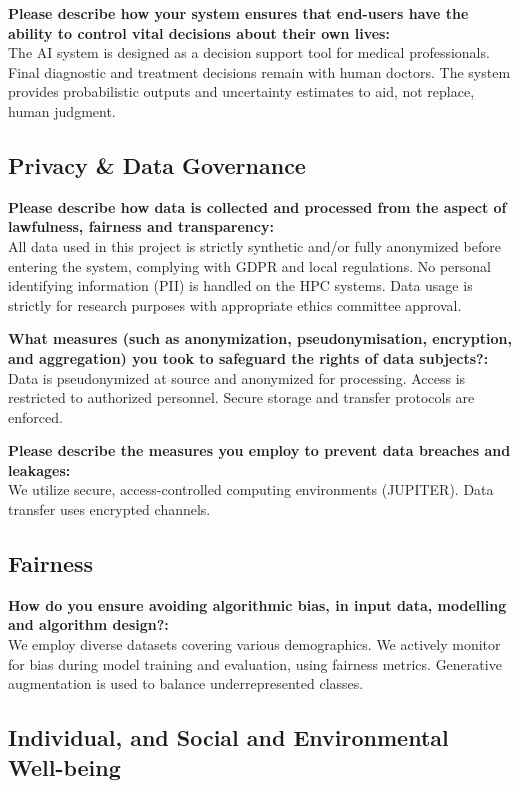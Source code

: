 \documentclass[12pt,a4paper]{article}
\begin{document}
\textbf{Please describe how your system ensures that end-users have the ability to control vital decisions about their own lives:} \\
The AI system is designed as a decision support tool for medical professionals. Final diagnostic and treatment decisions remain with human doctors. The system provides probabilistic outputs and uncertainty estimates to aid, not replace, human judgment.

\subsection*{Privacy \& Data Governance}

\textbf{Please describe how data is collected and processed from the aspect of lawfulness, fairness and transparency:} \\
All data used in this project is strictly synthetic and/or fully anonymized before entering the system, complying with GDPR and local regulations. No personal identifying information (PII) is handled on the HPC systems. Data usage is strictly for research purposes with appropriate ethics committee approval.

\textbf{What measures (such as anonymization, pseudonymisation, encryption, and aggregation) you took to safeguard the rights of data subjects?:} \\
Data is pseudonymized at source and anonymized for processing. Access is restricted to authorized personnel. Secure storage and transfer protocols are enforced.

\textbf{Please describe the measures you employ to prevent data breaches and leakages:} \\
We utilize secure, access-controlled computing environments (JUPITER). Data transfer uses encrypted channels.

\subsection*{Fairness}

\textbf{How do you ensure avoiding algorithmic bias, in input data, modelling and algorithm design?:} \\
We employ diverse datasets covering various demographics. We actively monitor for bias during model training and evaluation, using fairness metrics. Generative augmentation is used to balance underrepresented classes.

\subsection*{Individual, and Social and Environmental Well-being}
\end{document}
